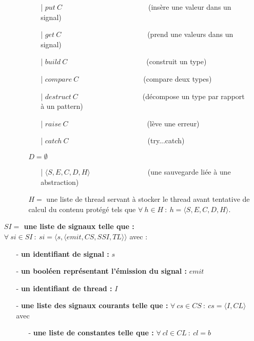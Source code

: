 \documentclass[10pt,a4paper]{report}
\begin{document}
\begin{itemize}
\begin{itemize}
\begin{itemize}
\begin{itemize}
					\item[|] $put~C$~~~~~~~~~~~~~~~~~~~~~~~~(insère une valeur dans un signal)
					\item[|] $get~C$~~~~~~~~~~~~~~~~~~~~~~~~(prend une valeurs dans un signal)
					\item[|] $build~C$~~~~~~~~~~~~~~~~~~~~~~(construit un type)
					\item[|] $compare~C$~~~~~~~~~~~~~~~~~~(compare deux types)
					\item[|] $destruct~C$~~~~~~~~~~~~~~~~~~(décompose un type par rapport à un pattern)
					\item[|] $raise~C$~~~~~~~~~~~~~~~~~~~~~~(lève une erreur)
					\item[|] $catch~C$~~~~~~~~~~~~~~~~~~~~~~(try...catch)
				\end{itemize}
				\item[] $D = \emptyset$
				\begin{itemize}
					\item[|] $\langle S,E,C,D,H\rangle$~~~~~~~~~~~~~~~~(une sauvegarde liée à une abstraction)
				\end{itemize}
				
				\item[] $H =$ une liste de thread servant à stocker le thread avant tentative de calcul du contenu protégé tels que 
 				$\forall~h \in H~:~h = \langle S,E,C,D,H\rangle$.
			\end{itemize}	
		\end{itemize}
		
		\item[]
		\item[] \textbf{$SI =$ une liste de signaux telle que :} $\forall~si \in SI~:~si = \langle s,\langle emit,CS,SSI,TL\rangle\rangle$ avec :
		\begin{itemize}
			\item[] - \textbf{un identifiant de signal :} $s$
			\item[] - \textbf{un booléen représentant l'émission du signal :} $emit$
			\item[] - \textbf{un identifiant de thread :} $I$
			\item[] - \textbf{une liste des signaux courants telle que :} $\forall~cs \in CS~:~cs = \langle I,CL\rangle$ avec 
			\begin{itemize}
				\item[] - \textbf{une liste de constantes telle que :} $\forall~cl \in CL~:~cl = b$
			\end{itemize}
			

\end{itemize}
\end{itemize}
\end{document}
